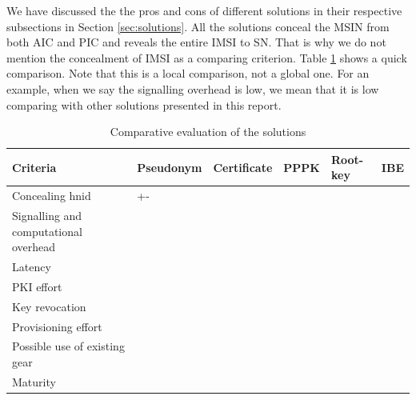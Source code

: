 \documentclass[runningheads,a4paper]{llncs} %
\begin{document}
We have discussed the the pros and cons of different solutions in their respective subsections in Section \ref{sec:solutions}. All the solutions conceal the MSIN from both AIC and PIC and reveals the entire IMSI to SN. That is why we do not mention the concealment of IMSI as a comparing criterion.  Table \ref{table:comparison} shows a quick comparison. Note that this is a local comparison, not a global one. For an example, when we say the signalling overhead is low, we mean that it is low comparing with other solutions presented in this report. 
\begin{table}
\begin{center}
\begin{tabular}{ |p{3.5cm}|p{2cm}|p{1.75cm}|p{1cm}|p{1.5cm}|p{1cm}|  }
\hline
\textbf{Criteria} & \textbf{Pseudonym} & \textbf{Certificate} & \textbf{PPPK} & \textbf{Root-key} & \textbf{IBE}\\
\hline \hline
Concealing hnid & +- &  &  & & \\ \hline
Signalling and computational overhead &  &  &  & & \\ \hline
Latency &  &  &  &  &  \\ \hline
PKI effort & & & & &  \\ \hline
Key revocation & & & & &  \\ \hline
Provisioning effort & & & & &  \\ \hline
Possible use of existing gear & & & &  &  \\ \hline
Maturity  & & & & &  \\ \hline
\end{tabular}
\vspace{5pt}
\caption{Comparative evaluation of the solutions}
\label{table:comparison}
\end{center}
\end{table}


\end{document}
